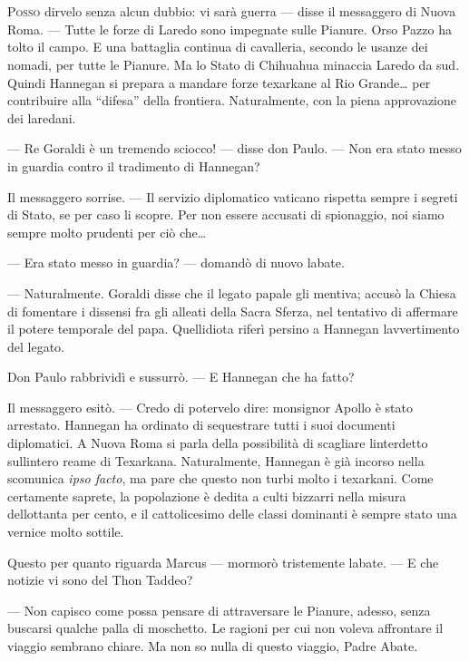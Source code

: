 	\chapter{\phantom{title}}

\lettrine{P}{osso} dirvelo senza alcun dubbio: vi sarà guerra --- disse il
messaggero di Nuova Roma. --- Tutte le forze di Laredo sono impegnate
sulle Pianure. Orso Pazzo ha tolto il campo. E una battaglia continua di
cavalleria, secondo le usanze dei nomadi, per tutte le Pianure. Ma lo
Stato di Chihuahua minaccia Laredo da sud. Quindi Hannegan si prepara a
mandare forze texarkane al Rio Grande\ldots{} per contribuire alla
``difesa'' della frontiera. Naturalmente, con la piena approvazione dei
laredani.

--- Re Goraldi è un tremendo sciocco! --- disse don Paulo. --- Non era
stato messo in guardia contro il tradimento di Hannegan?

Il messaggero sorrise. --- Il servizio diplomatico vaticano rispetta
sempre i segreti di Stato, se per caso li scopre. Per non essere
accusati di spionaggio, noi siamo sempre molto prudenti per ciò
che\ldots{}

--- Era stato messo in guardia? --- domandò di nuovo
l\textquotesingle abate.

--- Naturalmente. Goraldi disse che il legato papale gli mentiva; accusò
la Chiesa di fomentare i dissensi fra gli alleati della Sacra Sferza,
nel tentativo di affermare il potere temporale del papa.
Quell\textquotesingle idiota riferì persino a Hannegan
l\textquotesingle avvertimento del legato.

Don Paulo rabbrividì e sussurrò. --- E Hannegan che ha fatto?

Il messaggero esitò. --- Credo di potervelo dire: monsignor Apollo è
stato arrestato. Hannegan ha ordinato di sequestrare tutti i suoi
documenti diplomatici. A Nuova Roma si parla della possibilità di
scagliare l\textquotesingle interdetto sull\textquotesingle intero reame
di Texarkana. Naturalmente, Hannegan è già incorso nella scomunica
\emph{ipso facto}, ma pare che questo non turbi molto i texarkani. Come
certamente saprete, la popolazione è dedita a culti bizzarri nella
misura dell\textquotesingle ottanta per cento, e il cattolicesimo delle
classi dominanti è sempre stato una vernice molto sottile.

Questo per quanto riguarda Marcus --- mormorò tristemente
l\textquotesingle abate. --- E che notizie vi sono del Thon Taddeo?

--- Non capisco come possa pensare di attraversare le Pianure, adesso,
senza buscarsi qualche palla di moschetto. Le ragioni per cui non voleva
affrontare il viaggio sembrano chiare. Ma non so nulla di questo
viaggio, Padre Abate.

